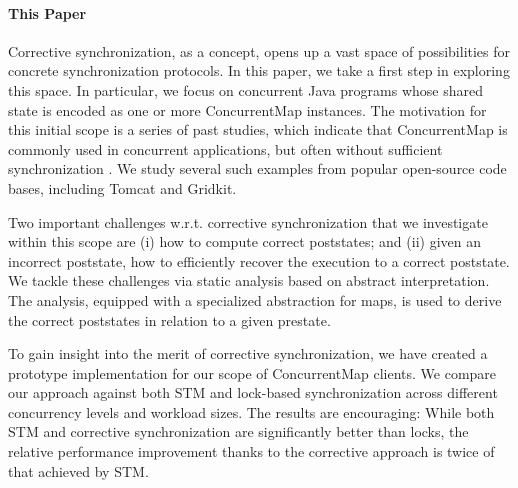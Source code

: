 \paragraph{This Paper} Corrective synchronization, as a concept, opens up a vast space of possibilities for concrete synchronization protocols. In this paper, we take a first step in exploring this space. In particular, we focus on concurrent Java programs whose shared state is encoded as one or more {\sf ConcurrentMap} instances. The motivation for this initial scope is a series of past studies, which indicate that {\sf ConcurrentMap} is commonly used in concurrent applications, but often without sufficient synchronization \cite{oopsla/ShachamBASVY11,issta/ShachamYGABSV14}. We study several such examples from popular open-source code bases, including Tomcat and Gridkit.

Two important challenges w.r.t. corrective synchronization that we investigate within this scope are (i) how to compute correct poststates; and (ii) given an incorrect poststate, how to efficiently recover the execution to a correct poststate. 
We tackle these challenges via static analysis based on abstract interpretation. The analysis, equipped with a specialized abstraction for maps, is used to derive the correct poststates in relation to a given prestate. 

To gain insight into the merit of corrective synchronization, we have created a prototype implementation for our scope of {\sf ConcurrentMap} clients. We compare our approach against both STM and lock-based synchronization across different concurrency levels and workload sizes. The results are encouraging: While both STM and corrective synchronization are significantly better than locks, the relative performance improvement thanks to the corrective approach is twice of that achieved by STM.
%
%
%
%

